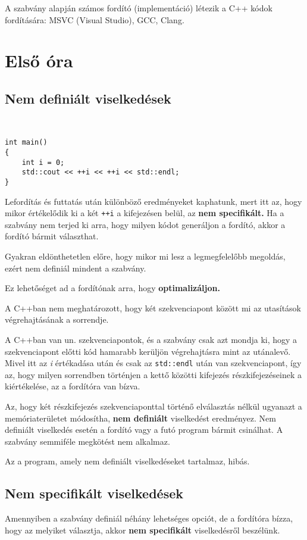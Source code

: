 \documentclass[a4paper,11.5pt]{article}
\begin{document}
	\medskip
  A szabvány alapján számos fordító (implementáció) létezik a C++ kódok fordítására: MSVC (Visual Studio), GCC, Clang. 
	\section{Első óra}
	\subsection{Nem definiált viselkedések}
	\begin{example}\ 
		
		\begin{lstlisting}
int main()
{
	int i = 0;
	std::cout << ++i << ++i << std::endl;
}
		\end{lstlisting}
		
		Lefordítás és futtatás után különböző eredményeket kaphatunk, mert itt az, hogy mikor értékelődik ki a két \texttt{++i} a kifejezésen belül, az \textbf{nem specifikált.} Ha a szabvány nem terjed ki arra, hogy milyen kódot generáljon a fordító, akkor a fordító bármit választhat. 
		
		\medskip
		Gyakran eldönthetetlen előre, hogy mikor mi lesz a legmegfelelőbb megoldás, ezért nem definiál mindent a szabvány.
		
		\medskip
		Ez lehetőséget ad a fordítónak arra, hogy \textbf{optimalizáljon.} 
	\end{example}
	
	A C++ban nem meghatározott, hogy két szekvenciapont között mi az utasítások végrehajtásának a sorrendje.
	
	\medskip
	A C++ban van un. szekvenciapontok, és a szabvány csak azt mondja ki, hogy a szekvenciapont előtti kód hamarabb kerüljön végrehajtásra mint az utánalevő.  Mivel itt az \textit{i} értékadása után és csak az \texttt{std::endl} után van szekvenciapont, így az, hogy milyen sorrendben történjen a kettő közötti kifejezés részkifejezéseinek a kiértékelése, az a fordítóra van bízva.
	
	\medskip
	Az, hogy két részkifejezés szekvenciaponttal történő elválasztás nélkül ugyanazt a memóriaterületet módosítha, \textbf{nem definiált} viselkedést eredményez. Nem definiált viselkedés esetén a fordító vagy a futó program bármit csinálhat. A szabvány semmiféle megkötést nem alkalmaz.
	\begin{note}
		Az a program, amely nem definiált viselkedéseket tartalmaz, hibás.
	\end{note}
	\subsection{Nem specifikált viselkedések}
	Amennyiben a szabvány definiál néhány lehetséges opciót, de a fordítóra bízza, hogy az melyiket választja, akkor \textbf{nem specifikált} viselkedésről beszélünk.
	
\end{document}
